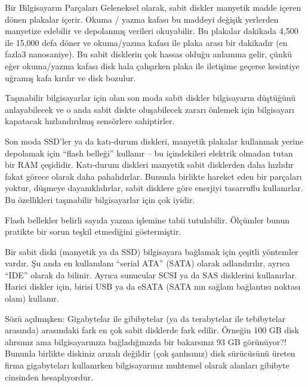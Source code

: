 \documentclass[10pt,a5paper]{book}
\begin{document}
\begin{section}{Bir Bilgisayarın Parçaları}
Geleneksel olarak, sabit diskler manyetik madde içeren dönen plakalar içerir. Okuma / yazma kafası bu maddeyi değişik yerlerden manyetize edebilir ve depolanmış verileri okuyabilir. Bu plakalar dakikada 4,500 ile 15,000 defa döner ve okuma/yazma kafası ile plaka arası bir dakikadır (en fazla3 nanosaniye). Bu sabit disklerin çok hassas olduğu anlamına gelir, çünkü eğer okuma/yazma kafası disk hala çalışırken plaka ile iletişime geçerse kesintiye uğramış kafa kırılır ve disk bozulur.

Taşınabilir bilgisayarlar için olan son moda sabit diskler bilgisayarın düştüğünü anlayabilecek ve o anda sabit diskte oluşabilecek zararı önlemek için bilgisayarı kapatacak hızlandırılmış sensörlere sahiptirler.

Son moda SSD'ler ya da katı-durum diskleri, manyetik plakalar kullanmak yerine depolamak için “flash belleği” kullanır – bu içindekileri elektrik olmadan tutan bir RAM çeşididir. Katı-durum diskleri manyetik sabit disklerden daha hızlıdır fakat görece olarak daha pahalıdırlar. Bununla birlikte hareket eden bir parçaları yoktur, düşmeye dayanıklıdırlar, sabit disklere göre enerjiyi tasarruflu kullanırlar. Bu özellikleri taşınabilir bilgisayarlar için çok iyidir.

Flash bellekler belirli sayıda yazma işlemine tabii tutulabilir. Ölçümler bunun pratikte bir sorun teşkil etmediğini göstermiştir.

Bir sabit diski (manyetik ya da SSD) bilgisayara bağlamak için çeşitli yöntemler vardır. Şu anda en kullanılanı “serial ATA” (SATA) olarak adlandırılır, ayrıca “IDE” olarak da bilinir. Ayrıca sunucular SCSI ya da SAS disklerini kullanırlar. Harici diskler için, birisi USB ya da eSATA (SATA nın sağlam bağlantısı noktası olanı) kullanır.

Sözü açılmışken: Gigabytelar ile gibibytelar (ya da terabytelar ile tebibytelar arasında) arasındaki fark en çok sabit disklerde fark edilir. Örneğin 100 GB disk alırsınız ama bilgisayarınıza bağladığınızda bir bakarsınız 93 GB görünüyor?! Bununla birlikte diskiniz arızalı değildir (çok şanlısınız) disk sürücüsünü üreten firma gigabyteları kullanırken bilgisayarınız muhtemel olarak alanları gibibyte cinsinden hesaplıyordur.

\end{section}
\end{document}
